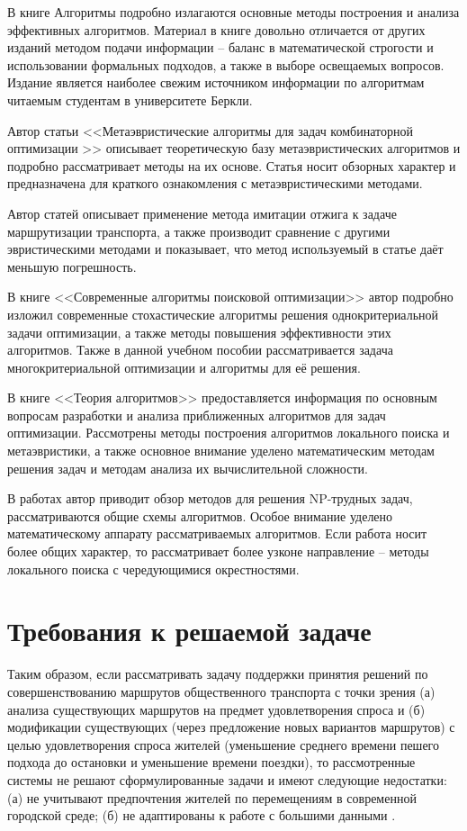 В книге Алгоритмы\cite{bib:47} подробно излагаются основные методы построения и анализа эффективных 
алгоритмов. Материал в книге довольно отличается от других изданий методом подачи информации -- баланс в 
математической строгости и использовании формальных подходов, а также в выборе освещаемых вопросов. 
Издание является наиболее свежим источником информации по алгоритмам читаемым студентам в университете Беркли.

Автор статьи <<Метаэвристические алгоритмы для задач комбинаторной оптимизации >>\cite{bib:48} описывает 
теоретическую базу метаэвристических алгоритмов и подробно рассматривает методы на их основе. Статья носит 
обзорных характер и предназначена для краткого ознакомления с метаэвристическими методами.

Автор статей \cite{bib:50,bib:51} описывает применение метода имитации отжига к задаче маршрутизации 
транспорта, а также производит сравнение с другими эвристическими методами и показывает, что метод 
используемый в статье даёт меньшую погрешность.

В книге <<Современные алгоритмы поисковой оптимизации>>\cite{bib:52} автор подробно изложил современные 
стохастические алгоритмы решения однокритериальной задачи оптимизации, а также методы повышения 
эффективности этих алгоритмов. Также в данной учебном пособии рассматривается задача многокритериальной 
оптимизации и алгоритмы для её решения.

В книге <<Теория алгоритмов>>\cite{bib:53} предоставляется информация по основным вопросам разработки и 
анализа приближенных алгоритмов для задач оптимизации. Рассмотрены методы построения алгоритмов 
локального поиска и метаэвристики, а также основное внимание уделено математическим методам решения задач 
и методам анализа их вычислительной сложности.

В работах \cite{bib:54,bib:57} автор приводит обзор методов для решения NP-трудных задач, рассматриваются 
общие схемы алгоритмов. Особое внимание уделено математическому аппарату рассматриваемых алгоритмов. 
Если работа \cite{bib:54} носит более общих характер, то \cite{bib:57} рассматривает более узконе 
направление -- методы локального поиска с чередующимися окрестностями.

\section{Требования к решаемой задаче}
Таким образом, если рассматривать задачу поддержки принятия решений по совершенствованию маршрутов 
общественного транспорта с точки зрения (а) анализа существующих маршрутов на предмет удовлетворения 
спроса и (б) модификации существующих (через предложение новых вариантов маршрутов) с целью удовлетворения 
спроса жителей (уменьшение среднего времени пешего подхода до остановки и уменьшение времени поездки), то 
рассмотренные системы не решают сформулированные задачи и имеют следующие недостатки: (а) не учитывают 
предпочтения жителей по перемещениям в современной городской среде; (б) не адаптированы к работе с 
большими данными \cite{bib:20,bib:20.2}.

